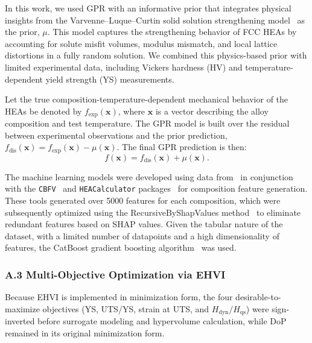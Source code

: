 \documentclass[preprint,12pt,times]{elsarticle}  %
\begin{document}
In this work, we used GPR with an informative prior that integrates physical insights from the Varvenne--Luque--Curtin solid solution strengthening model~\cite{varvenne2016theory} as the prior, $\mu$. This model captures the strengthening behavior of FCC HEAs by accounting for solute misfit volumes, modulus mismatch, and local lattice distortions in a fully random solution. We combined this physics-based prior with limited experimental data, including Vickers hardness (HV) and temperature-dependent yield strength (YS) measurements.

Let the true composition-temperature-dependent mechanical behavior of the HEAs be denoted by $f_{\textrm{exp}}(\mathbf{x})$, where $\mathbf{x}$ is a vector describing the alloy composition and test temperature. The GPR model is built over the residual between experimental observations and the prior prediction, $f_{\textrm{dis}}(\mathbf{x}) = f_{\textrm{exp}}(\mathbf{x}) - \mu(\mathbf{x})$. The final GPR prediction is then:
\[
f(\mathbf{x}) = f_{\textrm{dis}}(\mathbf{x}) + \mu(\mathbf{x}).
\]

The machine learning models were developed using data from~\cite{hastings2025accelerated} in conjunction with the {\tt CBFV}~\cite{Murdock2020IsProperties} and {\tt HEACalculator} packages~\cite{doguhan_sariturk_2022_7429046} for composition feature generation. These tools generated over 5000 features for each composition, which were subsequently optimized using the RecursiveByShapValues method~\cite{Prokhorenkova2018CatBoost:Features} to eliminate redundant features based on SHAP values. Given the tabular nature of the dataset, with a limited number of datapoints and a high dimensionality of features, the CatBoost gradient boosting algorithm~\cite{Prokhorenkova2018CatBoost:Features} was used.

\subsubsection*{A.3 Multi-Objective Optimization via EHVI}

Because EHVI is implemented in minimization form, the four desirable-to-maximize objectives (YS, UTS/YS, strain at UTS, and $H_\text{dyn}/H_\text{qs}$) were sign-inverted before surrogate modeling and hypervolume calculation, while DoP remained in its original minimization form.
\end{document}
